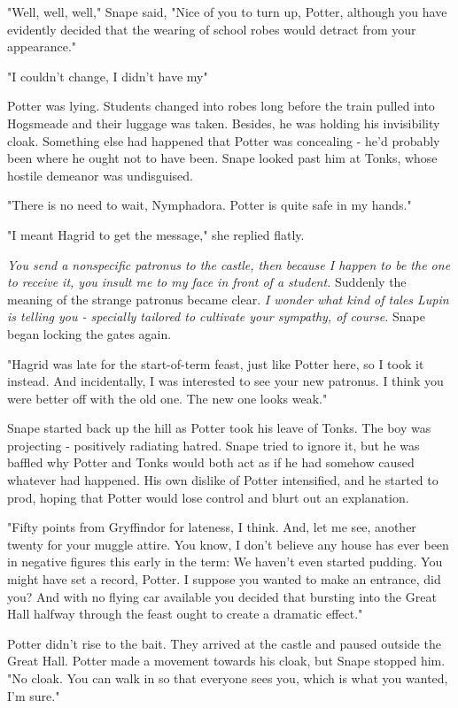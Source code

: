 "Well, well, well," Snape said, "Nice of you to turn up, Potter, although you have evidently decided that the wearing of school robes would detract from your appearance."

"I couldn't change, I didn't have my{\el}"

Potter was lying. Students changed into robes long before the train pulled into Hogsmeade and their luggage was taken. Besides, he was holding his invisibility cloak. Something else had happened that Potter was concealing - he'd probably been where he ought not to have been. Snape looked past him at Tonks, whose hostile demeanor was undisguised.

"There is no need to wait, Nymphadora. Potter is quite{\el} safe in my hands."

"I meant Hagrid to get the message," she replied flatly.

\emph{You send a nonspecific patronus to the castle, then because I happen to be the one to receive it, you insult me to my face in front of a student.} Suddenly the meaning of the strange patronus became clear. \emph{I wonder what kind of tales Lupin is telling you - specially tailored to cultivate your sympathy, of course.} Snape began locking the gates again.

"Hagrid was late for the start-of-term feast, just like Potter here, so I took it instead. And incidentally, I was interested to see your new patronus. I think you were better off with the old one. The new one looks weak."

Snape started back up the hill as Potter took his leave of Tonks. The boy was projecting - positively radiating hatred. Snape tried to ignore it, but he was baffled why Potter and Tonks would both act as if he had somehow caused whatever had happened. His own dislike of Potter intensified, and he started to prod, hoping that Potter would lose control and blurt out an explanation.

"Fifty points from Gryffindor for lateness, I think. And, let me see, another twenty for your muggle attire. You know, I don't believe any house has ever been in negative figures this early in the term: We haven't even started pudding. You might have set a record, Potter. I suppose you wanted to make an entrance, did you? And with no flying car available you decided that bursting into the Great Hall halfway through the feast ought to create a dramatic effect."

Potter didn't rise to the bait. They arrived at the castle and paused outside the Great Hall. Potter made a movement towards his cloak, but Snape stopped him. "No cloak. You can walk in so that everyone sees you, which is what you wanted, I'm sure."

